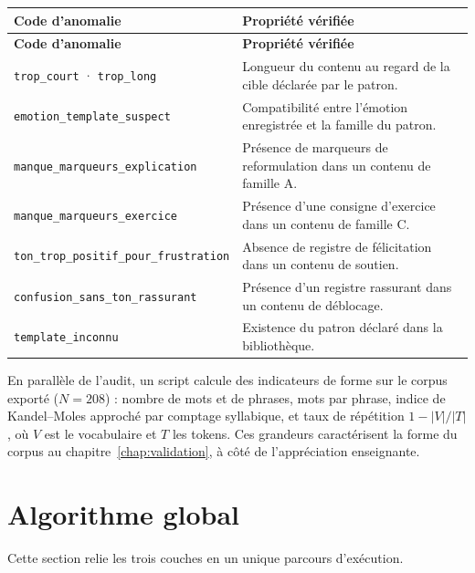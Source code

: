 {\small
\renewcommand{\arraystretch}{1.18}
\setlength{\tabcolsep}{4pt}
\begin{xltabular}{\textwidth}{|>{\raggedright\arraybackslash}X|>{\raggedright\arraybackslash}X|}
\hline
{}
\textbf{Code d'anomalie} & \textbf{Propriété vérifiée} \\
\hline
\endfirsthead
\hline
{}
\textbf{Code d'anomalie} & \textbf{Propriété vérifiée} \\
\hline
\endhead
\endfoot
\endlastfoot
\texttt{trop\_court} · \texttt{trop\_long} &
Longueur du contenu au regard de la cible déclarée par le patron. \\
\hline
\texttt{emotion\_\allowbreak template\_suspect} &
Compatibilité entre l'émotion enregistrée et la famille du patron. \\
\hline
\texttt{manque\_marqueurs\_\allowbreak explication} &
Présence de marqueurs de reformulation dans un contenu de famille A. \\
\hline
\texttt{manque\_marqueurs\_\allowbreak exercice} &
Présence d'une consigne d'exercice dans un contenu de famille C. \\
\hline
\texttt{ton\_trop\_positif\_\allowbreak pour\_frustration} &
Absence de registre de félicitation dans un contenu de soutien. \\
\hline
\texttt{confusion\_sans\_ton\_\allowbreak rassurant} &
Présence d'un registre rassurant dans un contenu de déblocage. \\
\hline
\texttt{template\_inconnu} &
Existence du patron déclaré dans la bibliothèque. \\
\hline
\end{xltabular}
\label{tab:audit-criteres}
}

En parallèle de l'audit, un script calcule des indicateurs de
forme sur le corpus exporté ($N=208$) : nombre de mots et de phrases,
mots par phrase, indice de Kandel--Moles approché par comptage
syllabique, et taux de répétition $1-|V|/|T|$, où $V$ est le
vocabulaire et $T$ les tokens. Ces grandeurs caractérisent la forme
du corpus au chapitre~\ref{chap:validation}, à côté de
l'appréciation enseignante.

\section{Algorithme global}
\label{sec:algo-global}

Cette section relie les trois couches en un unique parcours
d'exécution.

